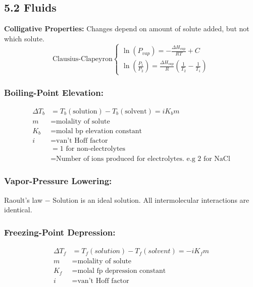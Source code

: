 \subsection{5.2 Fluids}
    \textbf{Colligative Properties: }Changes depend on amount of solute added, but not which solute.
    \vspace*{-0.5em}
    $$
    \text{Clausius-Clapeyron} \left\{
        \begin{array}{ll}
            \ln(P_{vap}) = - \frac{\Delta H_{vap}}{RT} + C\\
            \ln(\frac{P_1}{P_2}) = \frac{\Delta H_{vap}}{R} \left( \frac{1}{T_2} - \frac{1}{T_1} \right)
        \end{array}
        \right.
    $$

    \vspace*{0.0em}
    
    \subsubsection{Boiling-Point Elevation: }
        \begin{align*}
            \Delta T_b & = T_b (\textrm{solution}) - T_b (\textrm{solvent}) = iK_b m\\
            m & = \text{molality of solute}\\
            K_b & = \text{molal bp elevation constant}\\
            i & = \text{van't Hoff factor}\\
            & = 1 \text{ for non-electrolytes}\\
            & = \text{Number of ions produced for electrolytes.\ e.g 2 for NaCl}
        \end{align*}
    
    \subsubsection{Vapor-Pressure Lowering: }
    
        Raoult's law $-$ Solution is an ideal solution. All intermolecular interactions are identical. 

    \subsubsection{Freezing-Point Depression: }
        \begin{align*}
            \Delta T_f & = T_f (solution) - T_f (solvent) = -iK_{f}m\\
            m & = \text{molality of solute}\\
            K_f & = \text{molal fp depression constant}\\
            i & = \text{van't Hoff factor}
        \end{align*}